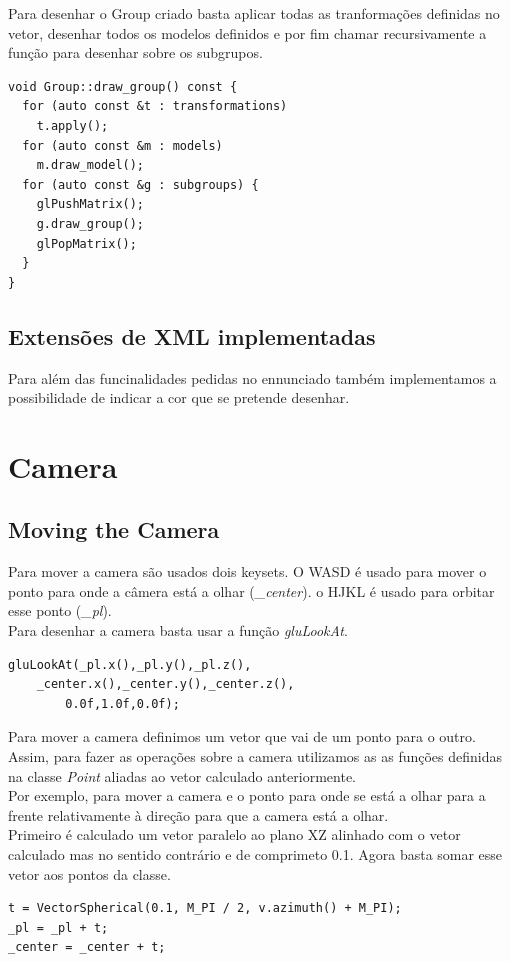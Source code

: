 \documentclass[a4paper]{report}
\begin{document}
Para desenhar o Group criado basta aplicar todas as tranformações definidas no
vetor, desenhar todos os modelos definidos e por fim chamar recursivamente a
função para desenhar sobre os subgrupos.

\begin{lstlisting}
void Group::draw_group() const {
  for (auto const &t : transformations)
    t.apply();
  for (auto const &m : models)
    m.draw_model();
  for (auto const &g : subgroups) {
    glPushMatrix();
    g.draw_group();
    glPopMatrix();
  }
}
\end{lstlisting}

\subsection{Extensões de XML implementadas}
Para além das funcinalidades pedidas no ennunciado também implementamos a
possibilidade de indicar a cor que se pretende desenhar.




\section{Camera}
\subsection{Moving the Camera}
Para mover a camera são usados dois keysets. O WASD é usado para mover o ponto
para onde a câmera está a olhar (\textit{\_center}). o HJKL é usado para orbitar
esse ponto (\textit{\_pl}).\\
Para desenhar a camera basta usar a função \textit{gluLookAt}.
\begin{lstlisting}
gluLookAt(_pl.x(),_pl.y(),_pl.z(), 
	_center.x(),_center.y(),_center.z(),
		0.0f,1.0f,0.0f);
\end{lstlisting}
Para mover a camera definimos um vetor que vai de um ponto para o outro.\\
Assim, para fazer as operações sobre a camera utilizamos as as funções definidas
na classe \textit{Point} aliadas ao vetor calculado anteriormente.\\
Por exemplo, para mover a camera e o ponto para onde se está a olhar para a
frente relativamente à direção para que a camera está a olhar.\\
Primeiro é calculado um vetor paralelo ao plano XZ alinhado com o vetor
calculado mas no sentido contrário e de comprimeto 0.1. Agora basta somar esse
vetor aos pontos da classe.\\
\begin{lstlisting}
t = VectorSpherical(0.1, M_PI / 2, v.azimuth() + M_PI);
_pl = _pl + t;
_center = _center + t;
\end{lstlisting}
\end{document}
